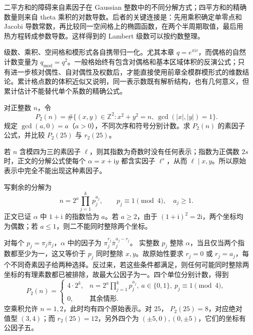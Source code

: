




\begin{chaptersummary}
二平方和的障碍来自素因子在 Gaussian 整数中的不同分解方式；四平方和的精确数量则来自 theta 乘积的对数导数。后者的关键连接是：先用乘积确定单零点和 Jacobi 导数常数，再比较同一空间格上的椭圆函数，在两个半周期取值，最后用热方程转成参数导数。这样得到的 Lambert 级数可以按约数整理。

级数、乘积、空间格和模形式各自携带归一化。尤其本章 \(q=e^{\pi\mathrm{i}\tau}\)，而偶格的自然计数变量为 \(q_{\mathrm{mod}}=q^2\)。一般格始终有包含对偶格和基本区域体积的反演公式；只有进一步核对偶性、自对偶性及权数后，才能直接使用前章全模群模形式的维数结论。累计格点数的体积近似又说明，同一表示数既有解析结构，也有几何意义，但累计估计不能替代单个系数的精确公式。
\end{chaptersummary}

\BookExercises

\begin{exercise}\label{b3:ex:24-1}
对正整数 \(n\)，令
\[
P_2(n)=\#\{(x,y)\in\mathbb Z^2:x^2+y^2=n,\ 
                                  \gcd(|x|,|y|)=1\}.
\]
规定 \(\gcd(a,0)=a\)（\(a>0\)），不同次序和符号分别计数。求 \(P_2(n)\) 的素因子公式，并比较 \(P_2(25)\) 与 \(r_2(25)\)。
\end{exercise}
\begin{solution}
若 \(n\) 含模四为三的素因子 \(\ell\)，则其指数为奇数时没有任何表示；指数为正偶数 \(2s\) 时，正文的分解公式使每个 \(\alpha=x+\mathrm{i}y\) 都含实因子 \(\ell^s\)，从而 \(\ell\mid x,y\)。所以原始表示中完全不能出现这种素因子。

写剩余的分解为
\[
n=2^a\prod_{j=1}^k p_j^{a_j},
\qquad p_j\equiv1\pmod4,\quad a_j\ge1.
\]
正文已证 \(\alpha\) 中 \(1+\mathrm{i}\) 的指数恰为 \(a\)。若 \(a\ge2\)，由于 \((1+\mathrm{i})^2=2\mathrm{i}\)，两个坐标均为偶数；若 \(a\le1\)，则二不能同时整除两个坐标。

对每个 \(p_j=\pi_j\bar\pi_j\)，\(\alpha\) 中的因子为
\(\pi_j^{r_j}\bar\pi_j^{a_j-r_j}\)。
实整数 \(p_j\) 整除 \(\alpha\)，当且仅当两个指数都至少为一，这又等价于 \(p_j\) 同时整除 \(x,y\)。故原始性要求
\(r_j=0\) 或 \(r_j=a_j\)，每个不同奇素因子给两种选择。反过来，若这些条件都满足，则任何可能同时整除两坐标的有理素数都已被排除，故最大公因子为一。四个单位分别计数，得到
\[
P_2(n)=
\begin{cases}
4\cdot2^k,&n=2^a\prod_{j=1}^k p_j^{a_j},\
                 a\in\{0,1\},\ p_j\equiv1\pmod4,\\
0,&\text{其余情形}.
\end{cases}
\]
空乘积允许 \(n=1,2\)，此时均有四个原始表示。对 \(25\)，
\(P_2(25)=8\)，对应绝对值型 \((3,4)\)；而 \(r_2(25)=12\)，另外四个为 \((\pm5,0),(0,\pm5)\)，它们的坐标有公因子五。
\end{solution}

